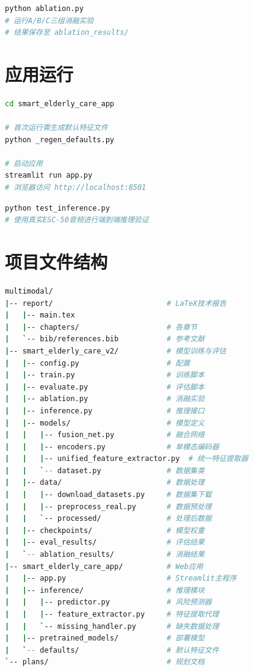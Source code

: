 \begin{lstlisting}[language=bash,caption={消融实验}]
python ablation.py
# 运行A/B/C三组消融实验
# 结果保存至 ablation_results/
\end{lstlisting}

\section{应用运行}

\begin{lstlisting}[language=bash,caption={启动Streamlit应用}]
cd smart_elderly_care_app

# 首次运行需生成默认特征文件
python _regen_defaults.py

# 启动应用
streamlit run app.py
# 浏览器访问 http://localhost:8501
\end{lstlisting}

\begin{lstlisting}[language=bash,caption={端到端推理测试}]
python test_inference.py
# 使用真实ESC-50音频进行端到端推理验证
\end{lstlisting}

\section{项目文件结构}

\begin{lstlisting}[language=bash,caption={项目目录结构}]
multimodal/
|-- report/                          # LaTeX技术报告
|   |-- main.tex
|   |-- chapters/                    # 各章节
|   `-- bib/references.bib           # 参考文献
|-- smart_elderly_care_v2/           # 模型训练与评估
|   |-- config.py                    # 配置
|   |-- train.py                     # 训练脚本
|   |-- evaluate.py                  # 评估脚本
|   |-- ablation.py                  # 消融实验
|   |-- inference.py                 # 推理接口
|   |-- models/                      # 模型定义
|   |   |-- fusion_net.py            # 融合网络
|   |   |-- encoders.py              # 单模态编码器
|   |   |-- unified_feature_extractor.py  # 统一特征提取器
|   |   `-- dataset.py               # 数据集类
|   |-- data/                        # 数据处理
|   |   |-- download_datasets.py     # 数据集下载
|   |   |-- preprocess_real.py       # 数据预处理
|   |   `-- processed/               # 处理后数据
|   |-- checkpoints/                 # 模型权重
|   |-- eval_results/                # 评估结果
|   `-- ablation_results/            # 消融结果
|-- smart_elderly_care_app/          # Web应用
|   |-- app.py                       # Streamlit主程序
|   |-- inference/                   # 推理模块
|   |   |-- predictor.py             # 风险预测器
|   |   |-- feature_extractor.py     # 特征提取代理
|   |   `-- missing_handler.py       # 缺失数据处理
|   |-- pretrained_models/           # 部署模型
|   `-- defaults/                    # 默认特征文件
`-- plans/                           # 规划文档
\end{lstlisting}


